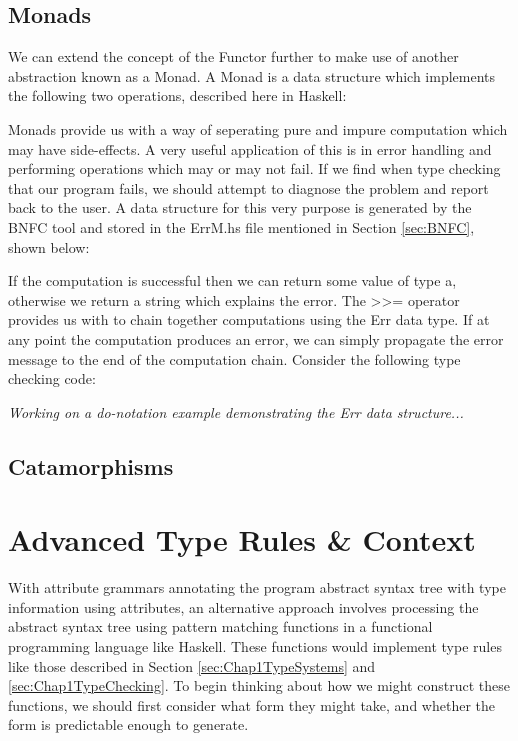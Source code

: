 \documentclass{UoYCSproject}
\begin{document}
\subsection{Monads}
We can extend the concept of the Functor further to make use of another
abstraction known as a Monad. A Monad is a data structure which implements the
following two operations, described here in Haskell:

Monads provide us with a way of seperating pure and impure computation which
may have side-effects. A very useful application of this is in error handling
and performing operations which may or may not fail. If we find when type
checking that our program fails, we should attempt to diagnose the problem and
report back to the user. A data structure for this very purpose is generated by
the BNFC tool and stored in the {\ttfamily ErrM.hs} file mentioned in Section
\ref{sec:BNFC}, shown below:

If the computation is successful then we can return some value of type
{\ttfamily a}, otherwise we return a string which explains the error. The
{\ttfamily >>=} operator provides us with to chain together computations using
the {\ttfamily Err} data type. If at any point the computation produces an
error, we can simply propagate the error message to the end of the computation
chain. Consider the following type checking code:
%

\textit{Working on a do-notation example demonstrating the Err data structure...}

\subsection{Catamorphisms}

\cite{PierceCategory}
\cite{MilewskiCTFP}
\cite{HuttonHaskell}
\cite{Catamorphisms}

\section{Advanced Type Rules \& Context}
With attribute grammars annotating the program abstract syntax tree with type
information using attributes, an alternative approach involves processing the
abstract syntax tree using pattern matching functions in a functional programming
language like Haskell. These functions would implement type rules like those
described in Section \ref{sec:Chap1TypeSystems} and \ref{sec:Chap1TypeChecking}.
To begin thinking about how we might construct these functions, we should first
consider what form they might take, and whether the form is predictable enough
to generate.
\end{document}
